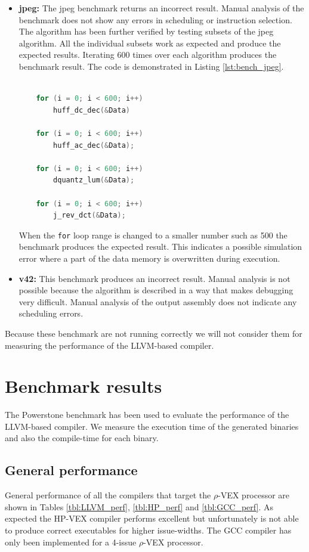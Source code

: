 \begin{itemize}
	\item \textbf{jpeg:} The jpeg benchmark returns an incorrect result. Manual analysis of the benchmark does not show any errors in scheduling or instruction selection. The algorithm has been further verified by testing subsets of the jpeg algorithm. All the individual subsets work as expected and produce the expected results. Iterating 600 times over each algorithm produces the benchmark result. The code is demonstrated in Listing \ref{lst:bench_jpeg}.



\begin{lstlisting}[language=c, label=lst:bench_jpeg,]

	for (i = 0; i < 600; i++)
		huff_dc_dec(&Data)

	for (i = 0; i < 600; i++)
		huff_ac_dec(&Data);

	for (i = 0; i < 600; i++)
		dquantz_lum(&Data);

	for (i = 0; i < 600; i++)
		j_rev_dct(&Data);

\end{lstlisting}

When the \texttt{for} loop range is changed to a smaller number such as 500 the benchmark produces the expected result. This indicates a possible simulation error where a part of the data memory is overwritten during execution.
	\item \textbf{v42:} This benchmark produces an incorrect result. Manual analysis is not possible because the algorithm is described in a way that makes debugging very difficult. Manual analysis of the output assembly does not indicate any scheduling errors.
\end{itemize}

Because these benchmark are not running correctly we will not consider them for measuring the performance of the LLVM-based compiler.


\section{Benchmark results}
The Powerstone benchmark has been used to evaluate the performance of the LLVM-based compiler. We measure the execution time of the generated binaries and also the compile-time for each binary. 

\subsection{General performance}
General performance of all the compilers that target the $\rho$-VEX processor are shown in Tables \ref{tbl:LLVM_perf}, \ref{tbl:HP_perf} and \ref{tbl:GCC_perf}. As expected the HP-VEX compiler performs excellent but unfortunately is not able to produce correct executables for higher issue-widths. The GCC compiler has only been implemented for a 4-issue $\rho$-VEX processor.

